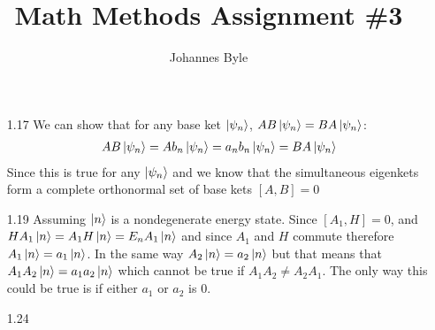 \documentclass[12pt]{article}
\title{Math Methods Assignment \#3}
\author{Johannes Byle}
\begin{document}
    \maketitle
    \begin{enumerate}
        \item[1.17]
        We can show that for any base ket $\ket{\psi_n}$, $AB\ket{\psi_n}=BA\ket{\psi_n}$:
        \begin{gather*}
            AB\ket{\psi_n}=Ab_n\ket{\psi_n}=a_n b_n\ket{\psi_n}=BA\ket{\psi_n}
        \end{gather*}
        Since this is true for any $\ket{\psi_n}$ and we know that the simultaneous eigenkets form a complete orthonormal set of base kets $[A, B]=0$
        \item[1.19]
        Assuming $\ket{n}$ is a nondegenerate energy state.
        Since $[A_1,H]=0$, and $HA_1\ket{n}=A_1 H\ket{n}=E_n A_1\ket{n}$ and since $A_1$ and $H$ commute therefore $A_1\ket{n}=a_1\ket{n}$.
        In the same way $A_2\ket{n}=a_2\ket{n}$ but that means that $A_1 A_2\ket{n}=a_1 a_2\ket{n}$ which cannot be true if $A_1 A_2\neq A_2 A_1$.
        The only way this could be true is if either $a_1$ or $a_2$ is 0.
        \item[1.24]
    \end{enumerate}
\end{document}
